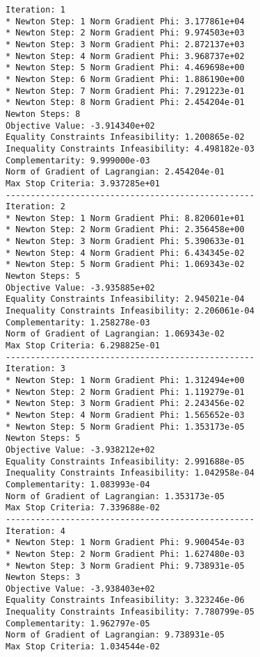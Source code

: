 \documentclass{article}
\begin{document}
\scriptsize
\begin{minipage}[t]{0.45\textwidth}
\begin{verbatim}
Iteration: 1
* Newton Step: 1 Norm Gradient Phi: 3.177861e+04
* Newton Step: 2 Norm Gradient Phi: 9.974503e+03
* Newton Step: 3 Norm Gradient Phi: 2.872137e+03
* Newton Step: 4 Norm Gradient Phi: 3.968737e+02
* Newton Step: 5 Norm Gradient Phi: 4.469698e+00
* Newton Step: 6 Norm Gradient Phi: 1.886190e+00
* Newton Step: 7 Norm Gradient Phi: 7.291223e-01
* Newton Step: 8 Norm Gradient Phi: 2.454204e-01
Newton Steps: 8
Objective Value: -3.914340e+02
Equality Constraints Infeasibility: 1.200865e-02
Inequality Constraints Infeasibility: 4.498182e-03
Complementarity: 9.999000e-03
Norm of Gradient of Lagrangian: 2.454204e-01
Max Stop Criteria: 3.937285e+01
--------------------------------------------------
Iteration: 2
* Newton Step: 1 Norm Gradient Phi: 8.820601e+01
* Newton Step: 2 Norm Gradient Phi: 2.356458e+00
* Newton Step: 3 Norm Gradient Phi: 5.390633e-01
* Newton Step: 4 Norm Gradient Phi: 6.434345e-02
* Newton Step: 5 Norm Gradient Phi: 1.069343e-02
Newton Steps: 5
Objective Value: -3.935885e+02
Equality Constraints Infeasibility: 2.945021e-04
Inequality Constraints Infeasibility: 2.206061e-04
Complementarity: 1.258278e-03
Norm of Gradient of Lagrangian: 1.069343e-02
Max Stop Criteria: 6.298825e-01
--------------------------------------------------
Iteration: 3
* Newton Step: 1 Norm Gradient Phi: 1.312494e+00
* Newton Step: 2 Norm Gradient Phi: 1.119279e-01
* Newton Step: 3 Norm Gradient Phi: 2.243456e-02
* Newton Step: 4 Norm Gradient Phi: 1.565652e-03
* Newton Step: 5 Norm Gradient Phi: 1.353173e-05
Newton Steps: 5
Objective Value: -3.938212e+02
Equality Constraints Infeasibility: 2.991688e-05
Inequality Constraints Infeasibility: 1.042958e-04
Complementarity: 1.083993e-04
Norm of Gradient of Lagrangian: 1.353173e-05
Max Stop Criteria: 7.339688e-02
--------------------------------------------------
Iteration: 4
* Newton Step: 1 Norm Gradient Phi: 9.900454e-03
* Newton Step: 2 Norm Gradient Phi: 1.627480e-03
* Newton Step: 3 Norm Gradient Phi: 9.738931e-05
Newton Steps: 3
Objective Value: -3.938403e+02
Equality Constraints Infeasibility: 3.323246e-06
Inequality Constraints Infeasibility: 7.780799e-05
Complementarity: 1.962797e-05
Norm of Gradient of Lagrangian: 9.738931e-05
Max Stop Criteria: 1.034544e-02
\end{verbatim}
\end{minipage}
\end{document}
